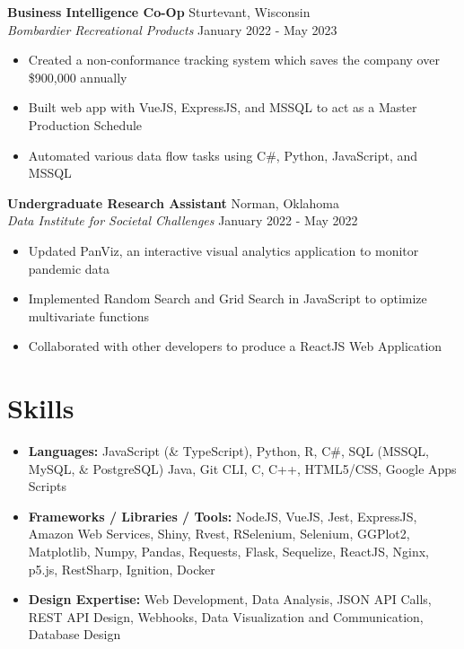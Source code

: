 \documentclass[a4paper,10pt]{extarticle}
\begin{document}
\noindent
\textbf{Business Intelligence Co-Op} \hfill Sturtevant, Wisconsin\\ %
\textit{Bombardier Recreational Products} \hfill January 2022 - May 2023 %
\begin{itemize}
    \item Created a non-conformance tracking system which saves the company over \$900,000 annually
    \item Built web app with VueJS, ExpressJS, and MSSQL to act as a Master Production Schedule
    \item Automated various data flow tasks using C\#, Python, JavaScript, and MSSQL
\end{itemize}

\noindent
\textbf{Undergraduate Research Assistant} \hfill Norman, Oklahoma\\ %
\textit{Data Institute for Societal Challenges} \hfill January 2022 - May 2022 %
\begin{itemize}
    \item Updated PanViz, an interactive visual analytics application to monitor pandemic data
    \item Implemented Random Search and Grid Search in JavaScript to optimize multivariate functions
    \item Collaborated with other developers to produce a ReactJS Web Application
\end{itemize}

\section*{Skills}
\begin{itemize}
    \item \textbf{Languages:} JavaScript (\& TypeScript), Python, R, C\#, SQL (MSSQL, MySQL, \& PostgreSQL) Java, Git CLI, C, C++, HTML5/CSS, Google Apps Scripts
    \item \textbf{Frameworks / Libraries / Tools:} NodeJS, VueJS, Jest, ExpressJS, Amazon Web Services, Shiny, Rvest,
    RSelenium, Selenium, GGPlot2, Matplotlib, Numpy, Pandas, Requests, Flask, Sequelize, ReactJS,
    Nginx, p5.js, RestSharp, Ignition, Docker
    \item \textbf{Design Expertise:} Web Development, Data Analysis, JSON API Calls, REST API Design,
    Webhooks, Data Visualization and Communication, Database Design
\end{itemize}
\end{document}

